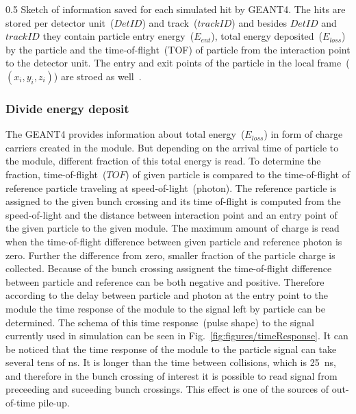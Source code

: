                 {0.5}       %
                 { Sketch of information saved for each simulated hit by GEANT4. The hits are stored per detector unit~($DetID$) and track~($trackID$) and besides $DetID$ and $trackID$ they contain particle entry energy~($E_{ent}$), total energy deposited~($E_{loss}$) by the particle and the time-of-flight~(TOF) of particle from the interaction point to the detector unit. The entry and exit points of the particle in the local frame~($(x_{i},y_{i},z_{i})$) are stroed as well~\cite{website:simuBasics}. }

\subsubsection{Divide energy deposit~\label{sec:divide}}

The GEANT4 provides information about total energy~($E_{loss}$) in form of charge carriers created in the module. But depending on the arrival time of particle to the module, different fraction of this total energy is read. To determine the fraction, time-of-flight~($TOF$) of given particle is compared to the time-of-flight of reference particle traveling at speed-of-light~(photon). The reference particle is assigned to the given bunch crossing and its time of-flight is computed from the speed-of-light and the distance between interaction point and an entry point of the given particle to the given module. The maximum amount of charge is read when the time-of-flight difference between given particle and reference photon is zero. Further the difference from zero, smaller fraction of the particle charge is collected. Because of the bunch crossing assignent the time-of-flight difference between particle and reference can be both negative and positive. Therefore according to the delay between particle and photon at the entry point to the module the time response of the module to the signal left by particle can be determined. The schema of this time response~(pulse shape) to the signal currently used in simulation can be seen in Fig.~\ref{fig:figures/timeResponse}. It can be noticed that the time response of the module to the particle signal can take several tens of ns. It is longer than the time between collisions, which is 25~ns, and therefore in the bunch crossing of interest it is possible to read signal from preceeding and suceeding bunch crossings. This effect is one of the sources of out-of-time pile-up.

